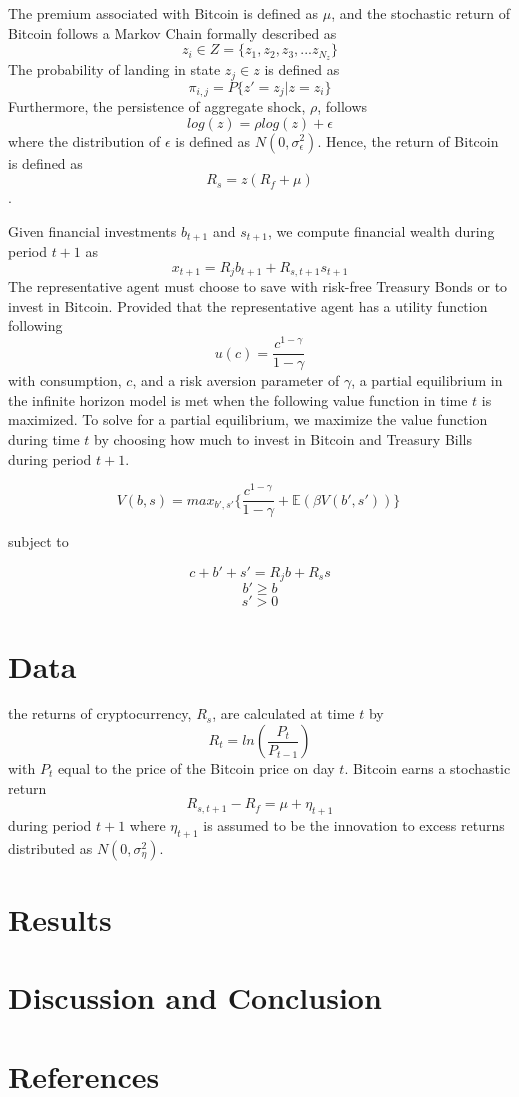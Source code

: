 \documentclass[]{article}
\begin{document}
The premium associated with Bitcoin is defined as \(\mu\), and the
stochastic return of Bitcoin follows a Markov Chain formally described
as \[z_i \in  Z = \{z_1, z_2, z_3, ... z_{N_z}\}\] The probability of
landing in state \(z_j \in z\) is defined as
\[\pi_{i,j} = P\{z' = z_j | z = z_i\}\] Furthermore, the persistence of
aggregate shock, \(\rho\), follows \[log(z) = \rho log(z) + \epsilon\]
where the distribution of \(\epsilon\) is defined as
\(N(0, \sigma_\epsilon^2)\). Hence, the return of Bitcoin is defined as
\[R_s = z(R_f + \mu)\].

Given financial investments \(b_{t+1}\) and \(s_{t+1}\), we compute
financial wealth during period \(t + 1\) as
\[x_{t+1} = R_jb_{t+1} + R_{s, t + 1} s_{t+1}\] The representative agent
must choose to save with risk-free Treasury Bonds or to invest in
Bitcoin. Provided that the representative agent has a utility function
following \[u(c) = \frac{c^{1-\gamma}}{1 - \gamma}\] with consumption,
\(c\), and a risk aversion parameter of \(\gamma\), a partial
equilibrium in the infinite horizon model is met when the following
value function in time \(t\) is maximized. To solve for a partial
equilibrium, we maximize the value function during time \(t\) by
choosing how much to invest in Bitcoin and Treasury Bills during period
\(t+1\).

\[V (b, s) = max_{b',s'} \{\frac{c^{1-\gamma}}{1 - \gamma} + \mathbb{E}(\beta V(b', s')) \}\ \]

subject to

\[c + b' + s' = R_jb + R_ss\] \[b' \geq b\] \[s' > 0\]

\section{Data}\label{data}

the returns of cryptocurrency, \(R_s\), are calculated at time \(t\) by
\[R_{t} = ln(\frac{P_t}{P_{t-1}})\] with \(P_t\) equal to the price of
the Bitcoin price on day \(t\). Bitcoin earns a stochastic return
\[R_{s, t+1} - R_f = \mu + \eta_{t+1}\] during period \(t + 1\) where
\(\eta_{t+1}\) is assumed to be the innovation to excess returns
distributed as \(N(0, \sigma_\eta^2)\).

\section{Results}\label{results}

\section{Discussion and Conclusion}\label{discussion-and-conclusion}

\section{References}\label{references}
\end{document}
